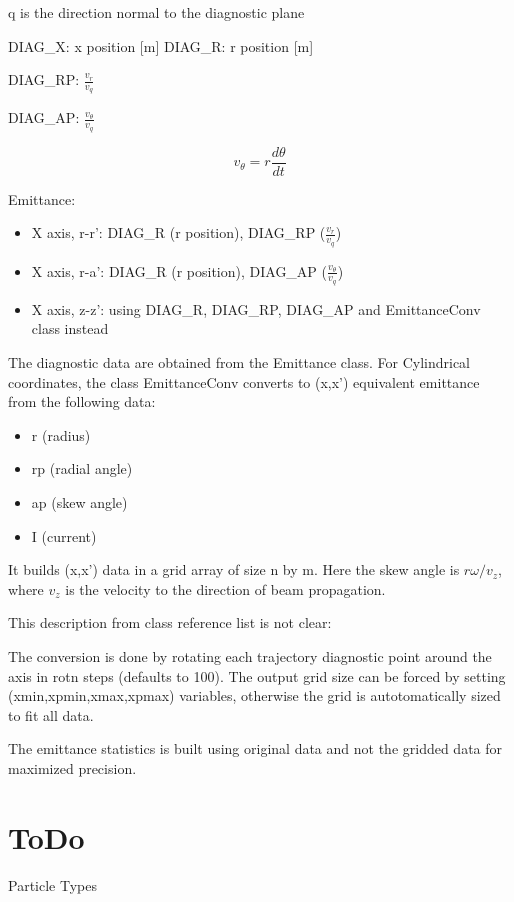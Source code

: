 \documentclass[12pt,a4paper]{article}
\begin{document}
q is the direction normal to the diagnostic plane

DIAG\_X: x position [m]
DIAG\_R: r position [m]



DIAG\_RP: $\frac{v_r}{v_q}$

DIAG\_AP: $\frac{v_\theta}{v_q}$

$$v_\theta=r\frac{d\theta}{dt}$$

Emittance:
\begin{itemize}
	\item X axis, r-r': DIAG\_R (r position), DIAG\_RP ($\frac{v_r}{v_q}$)
	\item X axis, r-a': DIAG\_R (r position), DIAG\_AP ($\frac{v_\theta}{v_q}$)
	\item X axis, z-z': using DIAG\_R, DIAG\_RP, DIAG\_AP and EmittanceConv class instead
\end{itemize}


The diagnostic data are obtained from the Emittance class. For Cylindrical coordinates, the class EmittanceConv converts to (x,x') equivalent emittance from the following data:

\begin{itemize}
	\item r (radius)
	\item rp (radial angle)
	\item ap (skew angle)
	\item I (current)
\end{itemize}

It builds (x,x') data in a grid array of size n by m. Here the skew angle is $ r\omega/v_z $, where $ v_z $ is the velocity to the direction of beam propagation. 



This description from class reference list is not clear: 

The conversion is done by rotating each trajectory diagnostic point around the axis in rotn steps (defaults to 100). The output grid size can be forced by setting (xmin,xpmin,xmax,xpmax) variables, otherwise the grid is autotomatically sized to fit all data.

The emittance statistics is built using original data and not the gridded data for maximized precision.


\section{ToDo}

Particle Types
\end{document}
